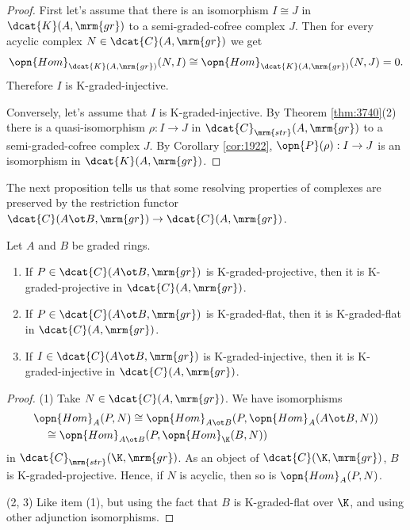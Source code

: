\begin{proof}
First let's assume that there is an isomorphism $I \cong J$ in 
$\dcat{K}(A, \mrm{gr})$ to a semi-graded-cofree complex $J$.
Then for every acyclic complex 
$N \in \dcat{C}(A, \mrm{gr})$ we get 
\[ \opn{Hom}_{\dcat{K}(A, \mrm{gr})}(N, I) \cong 
\opn{Hom}_{\dcat{K}(A, \mrm{gr})}(N, J) = 0 . \]
Therefore $I$ is K-graded-injective.

Conversely, let's assume that $I$ is K-graded-injective. By Theorem 
\ref{thm:3740}(2) there is a quasi-isomorphism
$\rho : I \to J$ in $\dcat{C}_{\mrm{str}}(A, \mrm{gr})$ to a 
semi-graded-cofree complex $J$. By Corollary \ref{cor:1922}, 
$\opn{P}(\rho) : I \to J$ is an 
isomorphism in $\dcat{K}(A, \mrm{gr})$.
\end{proof}

The next proposition tells us that some resolving properties of complexes are 
preserved by the restriction functor
$\dcat{C}(A \ot B, \mrm{gr}) \to \dcat{C}(A, \mrm{gr})$.

\begin{prop} \label{prop:4906}  
Let $A$ and $B$ be graded rings.
\begin{enumerate}
\item If $P \in \dcat{C}(A \ot B, \mrm{gr})$ is K-graded-projective, then it is 
K-graded-projective in $\dcat{C}(A, \mrm{gr})$.

\item If $P \in \dcat{C}(A \ot B, \mrm{gr})$ is K-graded-flat, then it is 
K-graded-flat in $\dcat{C}(A, \mrm{gr})$.

\item If $I \in \dcat{C}(A \ot B, \mrm{gr})$ is K-graded-injective, then it is 
K-graded-injective in $\dcat{C}(A, \mrm{gr})$.
\end{enumerate}
\end{prop}

\begin{proof} \mbox{}

\smallskip \noindent
(1) Take $N \in \dcat{C}(A, \mrm{gr})$. 
We have isomorphisms
\[ \begin{aligned}
& \opn{Hom}_{A}(P, N) \cong
\opn{Hom}_{A \ot B}(P, \opn{Hom}_A(A \ot B, N)) 
\\ & \quad  \cong \opn{Hom}_{A \ot B}(P, \opn{Hom}_{\K}(B, N)) 
\end{aligned} \]
in $\dcat{C}_{\mrm{str}}(\K, \mrm{gr})$. 
As an object of $\dcat{C}(\K, \mrm{gr})$, $B$ is K-graded-projective.
Hence, if $N$ is acyclic, then so is $\opn{Hom}_{A}(P, N)$.

\medskip \noindent
(2, 3) Like item (1), but using the fact that $B$ is 
K-graded-flat over $\K$, and using other adjunction isomorphisms.
\end{proof}

